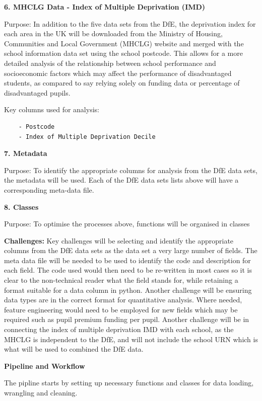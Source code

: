 \documentclass[
  letterpaper,
  DIV=11,
  numbers=noendperiod]{scrartcl}
\begin{document}
\textbf{6. MHCLG Data - Index of Multiple Deprivation (IMD)}

Purpose: In addition to the five data sets from the DfE, the deprivation
index for each area in the UK will be downloaded from the Ministry of
Housing, Communities and Local Government (MHCLG) website and merged
with the school information data set using the school postcode. This
allows for a more detailed analysis of the relationship between school
performance and socioeconomic factors which may affect the performance
of disadvantaged students, as compared to say relying solely on funding
data or percentage of disadvantaged pupils.

Key columns used for analysis:

\begin{verbatim}
    - Postcode                                   
    - Index of Multiple Deprivation Decile    
\end{verbatim}

\textbf{7. Metadata}

Purpose: To identify the appropriate columns for analysis from the DfE
data sets, the metadata will be used. Each of the DfE data sets lists
above will have a corresponding meta-data file.

\textbf{8. Classes}

Purpose: To optimise the processes above, functions will be organised in
classes

\textbf{Challenges:} Key challenges will be selecting and identify the
appropriate columns from the DfE data sets as the data set a very large
number of fields. The meta data file will be needed to be used to
identify the code and description for each field. The code used would
then need to be re-written in most cases so it is clear to the
non-technical reader what the field stands for, while retaining a format
suitable for a data column in python. Another challenge will be ensuring
data types are in the correct format for quantitative analysis. Where
needed, feature engineering would need to be employed for new fields
which may be required such as pupil premium funding per pupil. Another
challenge will be in connecting the index of multiple deprivation IMD
with each school, as the MHCLG is independent to the DfE, and will not
include the school URN which is what will be used to combined the DfE
data.

\textbf{Pipeline and Workflow}

The pipline starts by setting up necessary functions and classes for
data loading, wrangling and cleaning.
\end{document}
